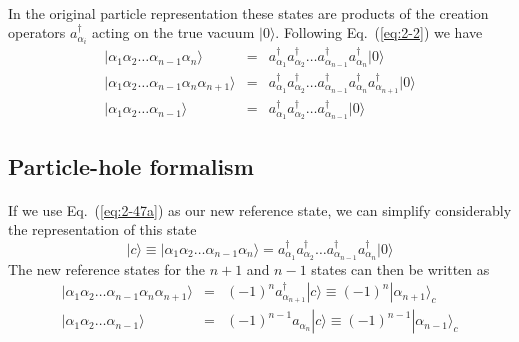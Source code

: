 \documentclass[%
twoside,                 %
final,                   %
10pt]{article}
\begin{document}
\paragraph{}
In the original particle representation these states are products of the creation operators  $a_{\alpha_i}^\dagger$ acting on the true vacuum $|0\rangle $.
Following Eq.~(\ref{eq:2-2}) we have 
\begin{eqnarray}
 |\alpha_1\alpha_2\dots\alpha_{n-1}\alpha_n\rangle &=& a_{\alpha_1}^\dagger a_{\alpha_2}^\dagger \dots
					a_{\alpha_{n-1}}^\dagger a_{\alpha_n}^\dagger |0\rangle  \label{eq:2-47a} \\
	|\alpha_1\alpha_2\dots\alpha_{n-1}\alpha_n\alpha_{n+1}\rangle &=&
		a_{\alpha_1}^\dagger a_{\alpha_2}^\dagger \dots a_{\alpha_{n-1}}^\dagger a_{\alpha_n}^\dagger
		a_{\alpha_{n+1}}^\dagger |0\rangle  \label{eq:2-47b} \\
	|\alpha_1\alpha_2\dots\alpha_{n-1}\rangle &=& a_{\alpha_1}^\dagger a_{\alpha_2}^\dagger \dots
		a_{\alpha_{n-1}}^\dagger |0\rangle  \label{eq:2-47c}
\end{eqnarray}



\subsection{Particle-hole formalism}

\paragraph{}
If we use Eq.~(\ref{eq:2-47a}) as our new reference state, we can simplify considerably the representation of 
this state
\begin{equation}
	|c\rangle  \equiv |\alpha_1\alpha_2\dots\alpha_{n-1}\alpha_n\rangle =
		a_{\alpha_1}^\dagger a_{\alpha_2}^\dagger \dots a_{\alpha_{n-1}}^\dagger a_{\alpha_n}^\dagger |0\rangle  \label{eq:2-48a}
\end{equation}
The new reference states for the $n+1$ and $n-1$ states can then be written as
\begin{eqnarray}
	|\alpha_1\alpha_2\dots\alpha_{n-1}\alpha_n\alpha_{n+1}\rangle &=& (-1)^n a_{\alpha_{n+1}}^\dagger |c\rangle 
		\equiv (-1)^n |\alpha_{n+1}\rangle_c \label{eq:2-48b} \\
	|\alpha_1\alpha_2\dots\alpha_{n-1}\rangle &=& (-1)^{n-1} a_{\alpha_n} |c\rangle  
		\equiv (-1)^{n-1} |\alpha_{n-1}\rangle_c \label{eq:2-48c} 
\end{eqnarray}
\end{document}
